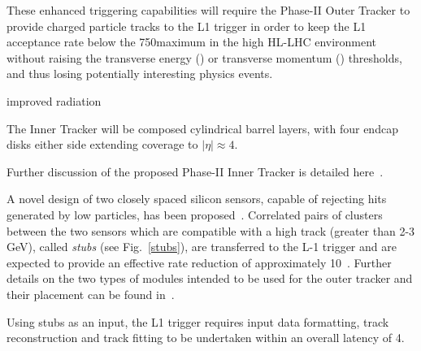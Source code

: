 These enhanced triggering capabilities will require the Phase-II Outer Tracker to provide charged particle tracks to the L1 trigger in order to keep the L1 acceptance rate below the 750\kHz maximum in the high \PU HL-LHC environment without raising the transverse energy (\ET) or transverse momentum (\pT) thresholds, and thus losing potentially interesting physics events.

improved radiation 

The Inner Tracker will be composed cylindrical barrel layers, with four endcap disks either side extending coverage to $|\eta|\approx4$.

Further discussion of the proposed Phase-II Inner Tracker is detailed here~\cite{P2TrackerTDR}.

A novel design of two closely spaced silicon sensors, capable of rejecting hits generated by low \pT particles, has been proposed~\cite{jjonespixel,markthesis}. Correlated pairs of clusters between the two sensors which are compatible with a high \pT track (greater than 2-3 GeV), called \textit{stubs} (see Fig.~\ref{stubs}), are transferred to the L-1 trigger and are expected to provide an effective rate reduction of approximately 10~\cite{mpessimperf,2dptmoduleconcept}. Further details on the two types of \pT modules intended to be used for the outer tracker and their placement can be found in~\cite{CMS_Upgrade_TP,P2TrackerTDR}.

Using stubs as an input, the L1 trigger requires input data formatting, track reconstruction and track fitting to be undertaken within an overall latency of 4\mus.  


